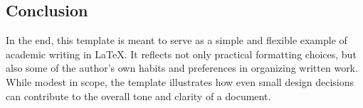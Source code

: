 \documentclass[11pt]{article}
\begin{document}
\subsection{Conclusion}

In the end, this template is meant to serve as a simple and flexible example of academic writing in LaTeX. It reflects not only practical formatting choices, but also some of the author's own habits and preferences in organizing written work. While modest in scope, the template illustrates how even small design decisions can contribute to the overall tone and clarity of a document.
\end{document}
